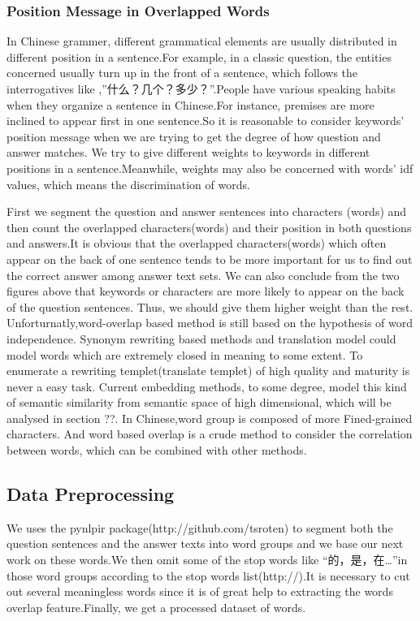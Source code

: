 \documentclass{llncs}
\begin{document}
\subsubsection{Position Message in Overlapped Words}
In Chinese grammer, different grammatical elements are usually distributed in different position in a sentence.For example, in a classic question, the entities concerned usually turn up in the front of a sentence, which follows the interrogatives like ,”什么？几个？多少？”.People have various speaking habits when they organize a sentence in Chinese.For instance, premises are more inclined to appear first in one sentence.So it is reasonable to consider keywords’ position message when we are trying to get the degree of how question and answer matches. We try to give different weights to keywords in different positions in a sentence.Meanwhile, weights may also be concerned with words’ idf values, which means the discrimination of words.





First we segment the question and answer sentences into characters (words) and then count the overlapped characters(words) and their position in both questions and answers.It is obvious that the overlapped characters(words) which often appear on the back of one sentence tends to be more important for us to find out the correct answer among answer text sets. We can also conclude from the two figures above that keywords or characters are more likely to appear on the back of the question sentences. Thus, we should give them higher weight than the rest.
Unforturnatly,word-overlap based method is still based on the hypothesis of word independence. Synonym rewriting based methods and translation model could model words which are extremely closed in meaning to some extent. To enumerate a rewriting templet(translate templet) of high quality and maturity is never a easy task. Current embedding methods, to some degree, model this kind of semantic similarity from semantic space of high dimensional, which will be analysed in section ??.
In Chinese,word group is composed of more Fined-grained characters. And word based overlap is a crude method to consider the correlation between words, which can be combined with other methods.


\subsection{Data Preprocessing}
We uses the pynlpir package(http://github.com/tsroten) to segment both the question sentences and the answer texts into word groups and we base our next work on these words.We then omit some of the stop words like “的，是，在…”in those word groups according to the stop words list(http://).It is necessary to cut out several meaningless words since it is of great help to extracting the words overlap feature.Finally, we get a processed dataset of words.
\end{document}
